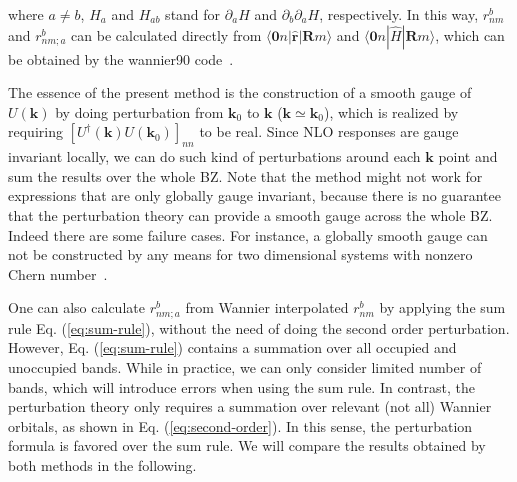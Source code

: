 where $a\ne b$, $H_{a}$ and $H_{ab}$ stand for $\partial_{a}H$ and $\partial_{b}\partial_{a}H$, respectively. In this way, $r_{nm}^{b}$ and $r_{nm;a}^{b}$ can be calculated directly from $\langle\mathbf{0}n|\hat{\mathbf{r}}|\mathbf{R}m\rangle$ and $\langle\mathbf{0}n|\hat{H}|\mathbf{R}m\rangle$, which can be obtained by the wannier90 code~\cite{mostofi_updated_2014}. 

The essence of the present method is the construction of a smooth gauge of $U(\mathbf{k})$ by doing perturbation from $\mathbf{k}_{0}$ to $\mathbf{k}$ ($\mathbf{k}\simeq\mathbf{k}_{0}$), which is realized by requiring $[U^{\dagger}(\mathbf{k})U(\mathbf{k}_{0})]_{nn}$ to be real. Since NLO responses are gauge invariant locally, we can do such kind of perturbations around each $\mathbf{k}$ point and sum the results over the whole BZ. Note that the method might not work for expressions that are only globally gauge invariant, because there is no guarantee that the perturbation theory can provide a smooth gauge across the whole BZ. Indeed there are some failure cases. For instance, a globally smooth gauge can not be constructed by any means for two dimensional systems with nonzero Chern number~\cite{b._andrei_bernevig_topological_2013}.

One can also calculate $r_{nm;a}^{b}$ from Wannier interpolated $r_{nm}^{b}$ by applying the sum rule Eq. (\ref{eq:sum-rule}), without the need of doing the second order perturbation. However, Eq. (\ref{eq:sum-rule}) contains a summation over all occupied and unoccupied bands. While in practice, we can only consider limited number of bands, which will introduce errors when using the sum rule. In contrast, the perturbation theory only requires a summation over relevant (not all) Wannier orbitals, as shown in Eq. (\ref{eq:second-order}). In this sense, the perturbation formula is favored over the sum rule. We will compare the results obtained by both methods in the following.